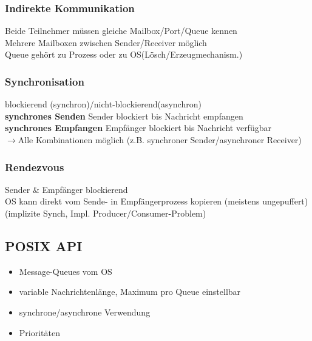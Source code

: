 \subsubsection{Indirekte Kommunikation}
Beide Teilnehmer müssen gleiche Mailbox/Port/Queue kennen\\
Mehrere Mailboxen zwischen Sender/Receiver möglich\\
Queue gehört zu Prozess oder zu OS(Lösch/Erzeugmechanism.)

\subsubsection{Synchronisation}
blockierend (synchron)/nicht-blockierend(asynchron)\\
\textbf{synchrones Senden} Sender blockiert bis Nachricht empfangen\\
\textbf{synchrones Empfangen} Empfänger blockiert bis Nachricht verfügbar\\
$\rightarrow$Alle Kombinationen möglich (z.B. synchroner Sender/asynchroner Receiver)

\subsubsection{Rendezvous}
Sender \& Empfänger blockierend\\
OS kann direkt vom Sende- in Empfängerprozess kopieren (meistens ungepuffert)
(implizite Synch, Impl. Producer/Consumer-Problem)



\subsection{POSIX API}
\begin{itemize}
    \item Message-Queues vom OS
    \item variable Nachrichtenlänge, Maximum pro Queue einstellbar
    \item synchrone/asynchrone Verwendung
    \item Prioritäten
\end{itemize}

